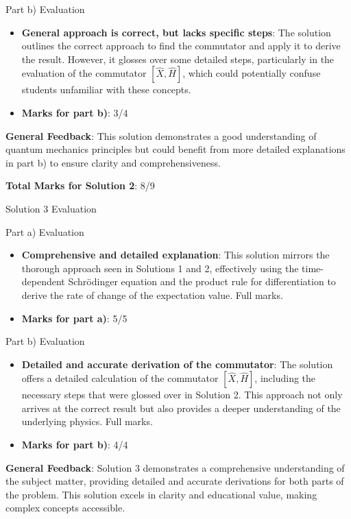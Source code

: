 \documentclass[a4paper,11pt]{article}
\begin{document}
Part b) Evaluation

\begin{itemize}
    \item \textbf{General approach is correct, but lacks specific steps}: The solution outlines the correct approach to find the commutator and apply it to derive the result. However, it glosses over some detailed steps, particularly in the evaluation of the commutator \(\left[ \hat{X}, \hat{H}\right]\), which could potentially confuse students unfamiliar with these concepts.
    \item \textbf{Marks for part b)}: 3/4
\end{itemize}

\textbf{General Feedback}: This solution demonstrates a good understanding of quantum mechanics principles but could benefit from more detailed explanations in part b) to ensure clarity and comprehensiveness.

\textbf{Total Marks for Solution 2}: 8/9

Solution 3 Evaluation

Part a) Evaluation

\begin{itemize}
    \item \textbf{Comprehensive and detailed explanation}: This solution mirrors the thorough approach seen in Solutions 1 and 2, effectively using the time-dependent Schrödinger equation and the product rule for differentiation to derive the rate of change of the expectation value. Full marks.
    \item \textbf{Marks for part a)}: 5/5
\end{itemize}

Part b) Evaluation

\begin{itemize}
    \item \textbf{Detailed and accurate derivation of the commutator}: The solution offers a detailed calculation of the commutator \(\left[ \hat{X}, \hat{H}\right]\), including the necessary steps that were glossed over in Solution 2. This approach not only arrives at the correct result but also provides a deeper understanding of the underlying physics. Full marks.
    \item \textbf{Marks for part b)}: 4/4
\end{itemize}

\textbf{General Feedback}: Solution 3 demonstrates a comprehensive understanding of the subject matter, providing detailed and accurate derivations for both parts of the problem. This solution excels in clarity and educational value, making complex concepts accessible.
\end{document}
